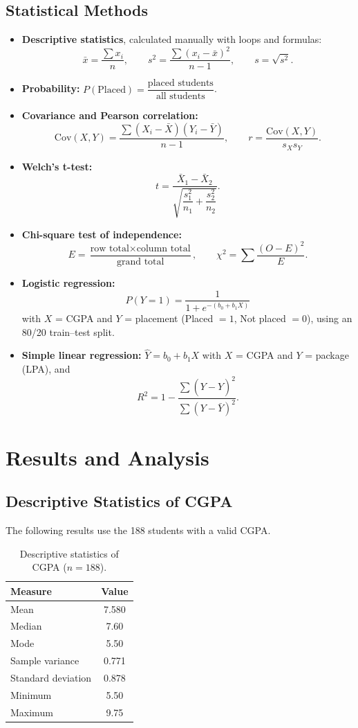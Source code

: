 \documentclass[12pt,a4paper]{article}
\begin{document}
\subsection{Statistical Methods}
\begin{itemize}[noitemsep]
  \item \textbf{Descriptive statistics}, calculated manually with loops and formulas:
  \[
  \bar{x}=\frac{\sum x_i}{n},\qquad s^2=\frac{\sum (x_i-\bar{x})^2}{n-1},\qquad s=\sqrt{s^2}.
  \]
  \item \textbf{Probability:} $P(\text{Placed})=\dfrac{\text{placed students}}{\text{all students}}$.
  \item \textbf{Covariance and Pearson correlation:}
  \[
  \mathrm{Cov}(X,Y)=\frac{\sum (X_i-\bar X)(Y_i-\bar Y)}{n-1},\qquad r=\frac{\mathrm{Cov}(X,Y)}{s_X s_Y}.
  \]
  \item \textbf{Welch's t-test:}
  \[
  t=\frac{\bar X_1-\bar X_2}{\sqrt{\dfrac{s_1^2}{n_1}+\dfrac{s_2^2}{n_2}}}.
  \]
  \item \textbf{Chi-square test of independence:}
  \[
  E=\frac{\text{row total}\times\text{column total}}{\text{grand total}},\qquad \chi^2=\sum\frac{(O-E)^2}{E}.
  \]
  \item \textbf{Logistic regression:}
  \[
  P(Y=1)=\frac{1}{1+e^{-(b_0+b_1X)}}
  \]
  with $X$ = CGPA and $Y$ = placement (Placed $=1$, Not placed $=0$), using an 80/20 train--test split.
  \item \textbf{Simple linear regression:} $\hat{Y}=b_0+b_1X$ with $X$ = CGPA and $Y$ = package (LPA), and
  \[
  R^2=1-\frac{\sum (Y-\hat Y)^2}{\sum (Y-\bar Y)^2}.
  \]
\end{itemize}

\section{Results and Analysis}

\subsection{Descriptive Statistics of CGPA}
The following results use the 188 students with a valid CGPA.

\begin{table}[H]
\centering
\begin{tabular}{lc}
\toprule
\textbf{Measure} & \textbf{Value} \\
\midrule
Mean & 7.580 \\
Median & 7.60 \\
Mode & 5.50 \\
Sample variance & 0.771 \\
Standard deviation & 0.878 \\
Minimum & 5.50 \\
Maximum & 9.75 \\
\bottomrule
\end{tabular}
\caption{Descriptive statistics of CGPA ($n=188$).}
\end{table}
\end{document}
